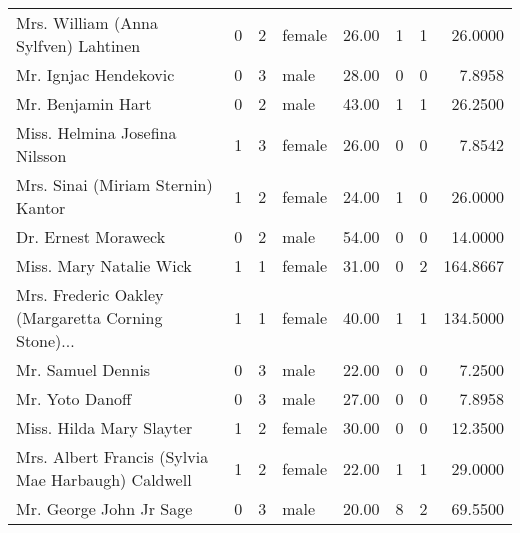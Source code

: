 \begin{tabular}{lrrlrrrr}
Mrs. William (Anna Sylfven) Lahtinen               &         0 &       2 &  female &  26.00 &                        1 &                        1 &   26.0000 \\
Mr. Ignjac Hendekovic                              &         0 &       3 &    male &  28.00 &                        0 &                        0 &    7.8958 \\
Mr. Benjamin Hart                                  &         0 &       2 &    male &  43.00 &                        1 &                        1 &   26.2500 \\
Miss. Helmina Josefina Nilsson                     &         1 &       3 &  female &  26.00 &                        0 &                        0 &    7.8542 \\
Mrs. Sinai (Miriam Sternin) Kantor                 &         1 &       2 &  female &  24.00 &                        1 &                        0 &   26.0000 \\
Dr. Ernest Moraweck                                &         0 &       2 &    male &  54.00 &                        0 &                        0 &   14.0000 \\
Miss. Mary Natalie Wick                            &         1 &       1 &  female &  31.00 &                        0 &                        2 &  164.8667 \\
Mrs. Frederic Oakley (Margaretta Corning Stone)... &         1 &       1 &  female &  40.00 &                        1 &                        1 &  134.5000 \\
Mr. Samuel Dennis                                  &         0 &       3 &    male &  22.00 &                        0 &                        0 &    7.2500 \\
Mr. Yoto Danoff                                    &         0 &       3 &    male &  27.00 &                        0 &                        0 &    7.8958 \\
Miss. Hilda Mary Slayter                           &         1 &       2 &  female &  30.00 &                        0 &                        0 &   12.3500 \\
Mrs. Albert Francis (Sylvia Mae Harbaugh) Caldwell &         1 &       2 &  female &  22.00 &                        1 &                        1 &   29.0000 \\
Mr. George John Jr Sage                            &         0 &       3 &    male &  20.00 &                        8 &                        2 &   69.5500 \\

\end{tabular}
